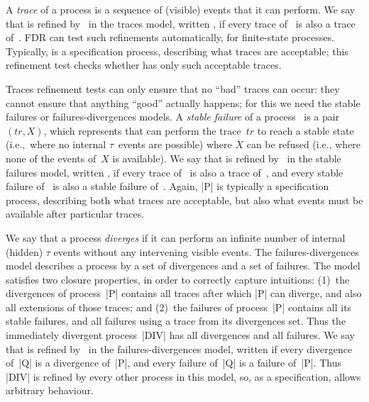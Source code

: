 A \emph{trace} of a process is a sequence of (visible) events that it
can perform.  We say that  is refined by~ in the traces model,
written \CSPM{P [T= Q}, if every trace of~ is also a trace
of~\@.  FDR can test such refinements automatically, for finite-state
processes.  Typically,  is a specification process, describing what
traces are acceptable; this refinement test checks whether  has only such
acceptable traces.  

Traces refinement tests can only ensure that no ``bad'' traces can occur: they
cannot ensure that anything ``good'' actually happens; for this we need the
stable failures or failures-divergences models.  A \emph{stable failure} of a
process~ is a pair $(tr,X)$, which represents that  can
perform the trace~$tr$ to reach a stable state (i.e.,~where no internal
$\tau$~events are possible) where $X$ can be refused (i.e., where none of the
events of~$X$ is available).  We say that  is refined by~ in
the stable failures model, written \CSPM{P [F= Q}, if every trace of~
is also a trace of~, and every stable failure of~ is also a
stable failure of~.  Again, |P| is typically a specification process,
describing both what traces are acceptable, but also what events must be
available after particular traces.

We say that a process \emph{diverges} if it can perform an infinite number of
internal (hidden) $\tau$ events without any intervening visible events.  The
failures-divergences model describes a process by a set of divergences and a
set of failures.  The model satisfies two closure properties, in order to
correctly capture intuitions: (1)~the divergences of process~|P|
contains all traces after which |P| can diverge, and also all extensions of
those traces; and (2)~the failures of process~|P| contains all its stable
failures, and all failures using a trace from its divergences set.  Thus the
immediately divergent process~|DIV| has all divergences and all failures.  We
say that  is refined by~ in the failures-divergences model,
written \CSPM{P [FD= Q}
if every divergence of~|Q| is a divergence of~|P|, and every failure of~|Q| is
a failure of~|P|.  Thus |DIV| is refined by every other process in this model,
so, as a specification, allows arbitrary behaviour.






